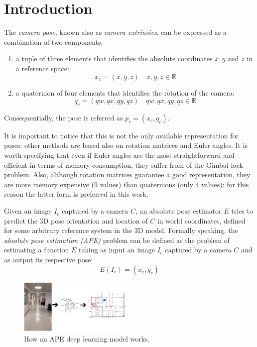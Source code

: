 \section{Introduction}
The \emph{camera pose}, known also as \emph{camera extrinsics}, can be expressed as a combination of two components:
\begin{enumerate}
    \item a tuple of three elements that identifies the absolute coordinates $x,y\text{ and }z$ in a reference space:
          \begin{equation}
              x_c=(x,y,z)\quad x,y,z \in \mathbb{R}
              \label{eq:absolute-position-definition}
          \end{equation}
    \item a quaternion of four elements that identifies the rotation of the camera:
          \begin{equation}
              q_c=(qw, qx, qy, qz)\quad qw,qx,qy,qz \in \mathbb{R}
              \label{eq:quaternion-as-rotation-definition}
          \end{equation}

\end{enumerate}
Consequentially, the pose is referred as $p_c=(x_c, q_c)$.

It is important to notice that this is not the only available representation for poses: other methods are based also on rotation matrices and Euler angles. It is worth specifying that even if Euler angles are the most straightforward and efficient in terms of memory consumption, they suffer from of the Gimbal lock problem. Also, although rotation matrices guarantee a good representation, they are more memory expensive (9 values) than quaternions (only 4 values): for this reason the latter form is preferred in this work.

Given an image $I_c$ captured by a camera $C$, an absolute pose estimator $E$ tries to predict the 3D pose orientation and location of $C$ in world coordinates, defined for some arbitrary reference system in the 3D model. Formally speaking, the \emph{absolute pose estimation (APE)} problem can be defined as the problem of estimating a function $E$ taking as input an image $I_c$ captured by a camera $C$ and as output its respective pose:
\begin{equation}
    E(I_c) = (x_c, q_c)
    \label{eq:absolute-pose-estimation-task}
\end{equation}

\begin{figure}[h]
    \begin{center}
        \includegraphics[width=0.48\textwidth]{./imgs/introduction_example.png}
    \end{center}
    \caption{How an APE deep learning model works.}
    \label{fig:introduction-example}
\end{figure}

